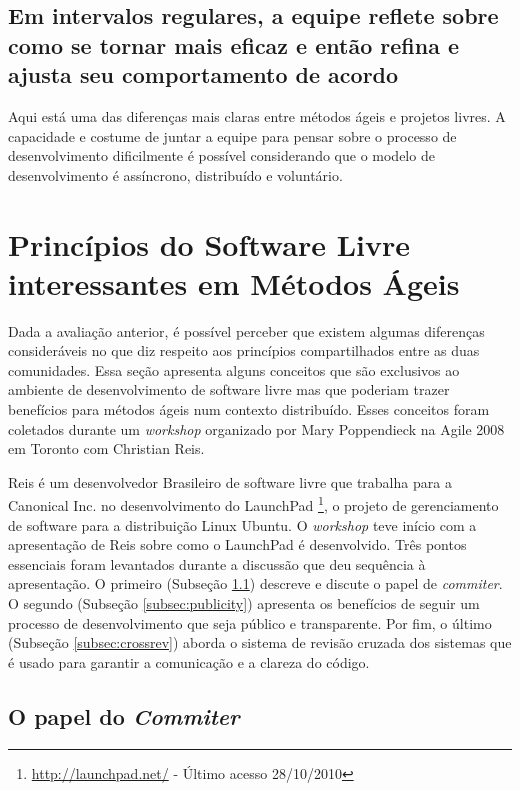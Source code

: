 \subsection[Refletir regularmente]{Em intervalos regulares, a equipe
  reflete sobre como se tornar mais eficaz e então refina e ajusta seu
  comportamento de acordo}

Aqui está uma das diferenças mais claras entre métodos ágeis e
projetos livres. A capacidade e costume de juntar a equipe para pensar
sobre o processo de desenvolvimento dificilmente é possível
considerando que o modelo de desenvolvimento é assíncrono, distribuído
e voluntário.

\section{Princípios do Software Livre interessantes em Métodos Ágeis}
\label{sec:foss-over-agile}

Dada a avaliação anterior, é possível perceber que existem algumas
diferenças consideráveis no que diz respeito aos princípios
compartilhados entre as duas comunidades. Essa seção apresenta alguns
conceitos que são exclusivos ao ambiente de desenvolvimento de
software livre mas que poderiam trazer benefícios para métodos ágeis
num contexto distribuído. Esses conceitos foram coletados durante um
\emph{workshop} organizado por Mary Poppendieck na Agile 2008 em
Toronto com Christian Reis.

Reis é um desenvolvedor Brasileiro de software livre que trabalha para
a Canonical Inc. no desenvolvimento do LaunchPad
\footnote{\url{http://launchpad.net/} - Último acesso 28/10/2010}, o
projeto de gerenciamento de software para a distribuição Linux
Ubuntu. O \emph{workshop} teve início com a apresentação de Reis sobre
como o LaunchPad é desenvolvido. Três pontos essenciais foram
levantados durante a discussão que deu sequência à apresentação. O
primeiro (Subseção \ref{subsec:commiter}) descreve e discute o papel
de \emph{commiter}.  O segundo (Subseção \ref{subsec:publicity})
apresenta os benefícios de seguir um processo de desenvolvimento que
seja público e transparente.  Por fim, o último (Subseção
\ref{subsec:crossrev}) aborda o sistema de revisão cruzada dos
sistemas que é usado para garantir a comunicação e a clareza do
código.

\subsection{O papel do \emph{Commiter}}
\label{subsec:commiter}

